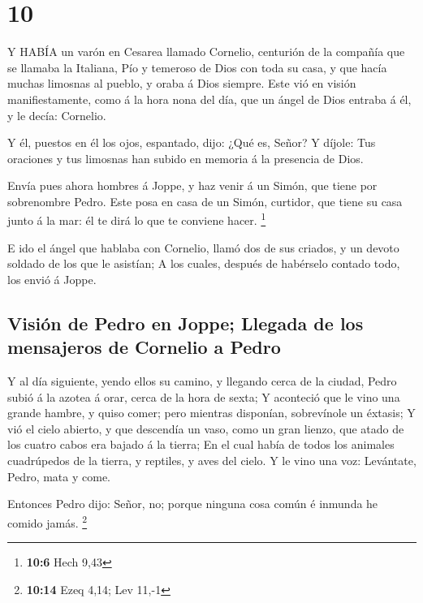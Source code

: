 \hypertarget{section-9}{%
\section{10}\label{section-9}}

 Y HABÍA un varón en Cesarea llamado Cornelio, centurión de
la compañía que se llamaba la Italiana,  Pío y temeroso de
Dios con toda su casa, y que hacía muchas limosnas al pueblo, y oraba á
Dios siempre.  Este vió en visión manifiestamente, como á la
hora nona del día, que un ángel de Dios entraba á él, y le decía:
Cornelio.

 Y él, puestos en él los ojos, espantado, dijo: ¿Qué es,
Señor? Y díjole: Tus oraciones y tus limosnas han subido en memoria á la
presencia de Dios.

 Envía pues ahora hombres á Joppe, y haz venir á un Simón,
que tiene por sobrenombre Pedro.  Este posa en casa de un
Simón, curtidor, que tiene su casa junto á la mar: él te dirá lo que te
conviene hacer. \footnote{\textbf{10:6} Hech 9,43}

 E ido el ángel que hablaba con Cornelio, llamó dos de sus
criados, y un devoto soldado de los que le asistían;  A los
cuales, después de habérselo contado todo, los envió á Joppe.

\hypertarget{visiuxf3n-de-pedro-en-joppe-llegada-de-los-mensajeros-de-cornelio-a-pedro}{%
\subsection{Visión de Pedro en Joppe; Llegada de los mensajeros de
Cornelio a
Pedro}\label{visiuxf3n-de-pedro-en-joppe-llegada-de-los-mensajeros-de-cornelio-a-pedro}}

 Y al día siguiente, yendo ellos su camino, y llegando cerca
de la ciudad, Pedro subió á la azotea á orar, cerca de la hora de sexta;
 Y aconteció que le vino una grande hambre, y quiso comer;
pero mientras disponían, sobrevínole un éxtasis;  Y vió el
cielo abierto, y que descendía un vaso, como un gran lienzo, que atado
de los cuatro cabos era bajado á la tierra;  En el cual
había de todos los animales cuadrúpedos de la tierra, y reptiles, y aves
del cielo.  Y le vino una voz: Levántate, Pedro, mata y
come.

 Entonces Pedro dijo: Señor, no; porque ninguna cosa común
é inmunda he comido jamás. \footnote{\textbf{10:14} Ezeq 4,14; Lev 11,-1}

